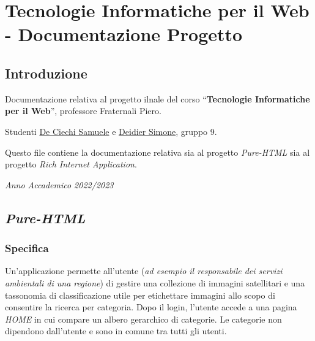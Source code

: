 \pagebreak

\hypertarget{tecnologie-informatiche-per-il-web---documentazione-progetto}{%
\section{Tecnologie Informatiche per il Web - Documentazione
Progetto}\label{tecnologie-informatiche-per-il-web---documentazione-progetto}}

\hypertarget{introduzione}{%
\subsection{Introduzione}\label{introduzione}}

Documentazione relativa al progetto ilnale del corso
``\textbf{Tecnologie Informatiche per il Web}'', professore Fraternali
Piero.

Studenti \href{https://github.com/Samdec01}{De Ciechi Samuele} e
\href{https://github.com/SimoneDeidier}{Deidier Simone}, gruppo 9.

Questo file contiene la documentazione relativa sia al progetto
\emph{Pure-HTML} sia al progetto \emph{Rich Internet
Application}.\newline\newline\newline

\emph{Anno Accademico 2022/2023}

\pagebreak

\hypertarget{pure-html}{%
\subsection{\texorpdfstring{\emph{Pure-HTML}}{Pure-HTML}}\label{pure-html}}

\hypertarget{specifica}{%
\subsubsection{Specifica}\label{specifica}}

Un'applicazione permette all'utente (\emph{ad esempio il responsabile
dei servizi ambientali di una regione}) di gestire una collezione di
immagini satellitari e una tassonomia di classificazione utile per
etichettare immagini allo scopo di consentire la ricerca per categoria.
Dopo il login, l'utente accede a una pagina \emph{HOME} in cui compare
un albero gerarchico di categorie. Le categorie non dipendono
dall'utente e sono in comune tra tutti gli utenti.

